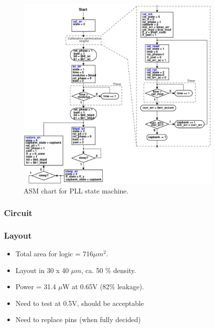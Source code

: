 			\begin{figure}[htb!]
			        \centering
			        \includegraphics[width=0.9\textwidth, angle=0]{./figs/pll_asm}
			    \caption{ASM chart for PLL state machine.}
			    \label{fig:asm}
			\end{figure}


		\subsubsection{Circuit}
		\subsubsection{Layout}

			\begin{itemize}[itemsep=4pt,label=\protect---]
			        \item Total area for logic = 716$\mu m^2$.
			        \item Layout in 30 x 40 $\mu m$, ca. 50 \% density.
			        \item Power = 31.4 $\mu$W at 0.65V (82\% leakage).
			        \item Need to test at 0.5V, should be acceptable
			        \item Need to replace pins (when fully decided)
			\end{itemize}


